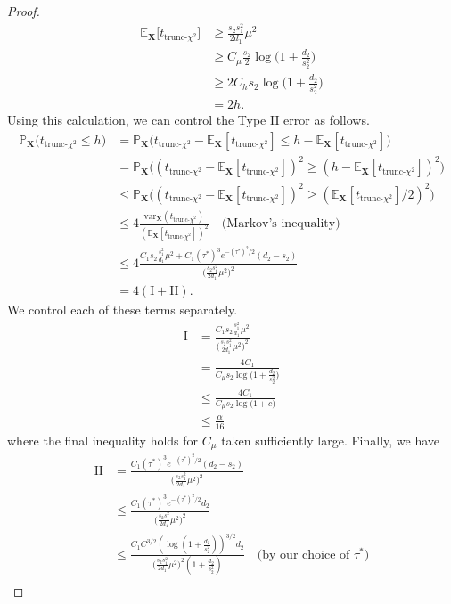 \documentclass{article}
\newcommand{\X}{\mathbf{X}}
\newcommand{\bbP}{\mathbb{P}}
\newcommand{\EE}{\mathbb{E}}
\newcommand{\var}{\textrm{var}}
\newcommand{\chisqlin}{\text{trunc-$\chi^2$}}
\theoremstyle{remark}
\begin{document}
\begin{proof}
\begin{align*}
        \EE_\X\big[t_{\chisqlin}\big] &\geq \frac{s_2s_1^2}{2d_1}\mu^2 \\
        &\geq C_\mu \frac{s_2}{2}\log\Big(1 + \frac{d_2}{s^2_2}\Big) \\
        &\geq 2C_h s_2 \log\Big(1 + \frac{d_2}{s^2_2}\Big) \\
        &= 2h.
    \end{align*}
    Using this calculation, we can control the Type II error as follows. 
    \begin{align*}
        \bbP_\X \big(t_{\chisqlin} \leq h\big) &= \bbP_\X \big(t_{\chisqlin} - \EE_\X[t_{\chisqlin}] \leq h - \EE_\X[t_{\chisqlin}]\big) \\
        &= \bbP_\X \big((t_{\chisqlin} - \EE_\X[t_{\chisqlin}])^2 \geq (h - \EE_\X[t_{\chisqlin}])^2\big) \\
        &\leq \bbP_\X \big((t_{\chisqlin} - \EE_\X[t_{\chisqlin}])^2 \geq (\EE_\X[t_{\chisqlin}] / 2)^2\big) \\
        &\leq 4\frac{\var_\X(t_{\chisqlin})}{(\EE_\X[t_{\chisqlin}])^2} \quad \text{(Markov's inequality)} \\
        &\leq 4\frac{C_1s_2\frac{s_1^2}{d_1}\mu^2 + C_1 (\tau^*)^3e^{-(\tau^*)^2/2}(d_2 - s_2)}{\big(\frac{s_2s_1^2}{2d_1}\mu^2\big)^2} \\
        &= 4(\text{I} + \text{II}).
    \end{align*}
    We control each of these terms separately.
    \begin{align*}
        \text{I} &= \frac{C_1s_2\frac{s_1^2}{d_1}\mu^2}{\big(\frac{s_2s_1^2}{2d_1}\mu^2\big)^2} \\
        &= \frac{4C_1}{C_\mu s_2\log\big(1 + \frac{d_2}{s_2^2}\big)} \\
        &\leq \frac{4C_1}{C_\mu s_2\log\big(1 + c\big)} \\
        &\leq \frac{\alpha}{16}
    \end{align*}
    where the final inequality holds for $C_\mu$ taken sufficiently large. Finally, we have 
    \begin{align*}
        \text{II} &= \frac{C_1 (\tau^*)^3e^{-(\tau^*)^2/2}(d_2 - s_2)}{\big(\frac{s_2s_1^2}{2d_1}\mu^2\big)^2} \\
        &\leq \frac{C_1 (\tau^*)^3e^{-(\tau^*)^2/2}d_2}{\big(\frac{s_2s_1^2}{2d_1}\mu^2\big)^2} \\
        &\leq \frac{C_1 C^{3/2} (\log(1 + \frac{d_2}{s_2^2}))^{3/2}d_2}{\big(\frac{s_2s_1^2}{2d_1}\mu^2\big)^2(1 + \frac{d_2}{s_2^2})} \quad \text{(by our choice of $\tau^*$)} \\

\end{align*}
\end{proof}
\end{document}
